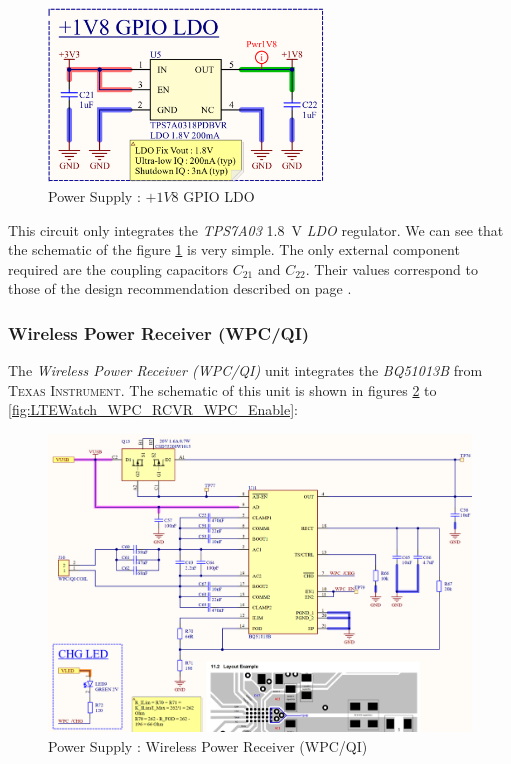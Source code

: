 \documentclass[report.tex]{subfiles}
\begin{document}
\begin{figure}[H]
	\centering
	\includegraphics[width=0.65\textwidth]{Include/Figure/Hardware/LTEWatch_Power_Supply_1V8_GPIO}
	\caption{Power Supply : $+1V8$ GPIO LDO}
	\label{fig:LTEWatch_Power_Supply_1V8_GPIO}
\end{figure}

This circuit only integrates the \textit{TPS7A03} \SI{1.8}{\volt} \textit{LDO} regulator. We can see that the schematic of the figure \ref{fig:LTEWatch_Power_Supply_1V8_GPIO} is very simple. The only external component required are the coupling capacitors $C_{21}$ and $C_{22}$. Their values correspond to those of the design recommendation described on page \pageref{sec:ldo_reg_sel}.

\subsubsection{Wireless Power Receiver (WPC/QI)}

The \textit{Wireless Power Receiver (WPC/QI)} unit integrates the \textit{BQ51013B} from \textsc{Texas Instrument}. The schematic of this unit is shown in figures \ref{fig:LTEWatch_WPC_RCVR_WPC} to \ref{fig:LTEWatch_WPC_RCVR_WPC_Enable}:

\begin{figure}[H]
	\centering
	\includegraphics[width=1\textwidth]{Include/Figure/Hardware/LTEWatch_WPC_RCVR_WPC}
	\caption{Power Supply : Wireless Power Receiver (WPC/QI)}
	\label{fig:LTEWatch_WPC_RCVR_WPC}
\end{figure}
\end{document}
